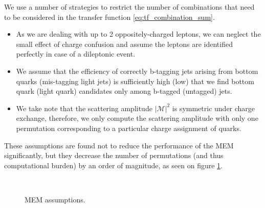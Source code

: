 We use a number of strategies to restrict the number of combinations that need to be considered in the transfer function \cref{eq:tf_combination_sum}. 
\begin{itemize}
\item As we are dealing with up to 2 oppositely-charged leptons, we can neglect the small effect of charge confusion and assume the leptons are identified perfectly in case of a dileptonic event.
\item We assume that the efficiency of correctly b-tagging jets arising from bottom quarks (mis-tagging light jets) is sufficiently high (low) that we find bottom quark (light quark) candidates only among b-tagged (untagged) jets.
\item We take note that the scattering amplitude $|\mathcal{M}|^2$ is symmetric under charge exchange, therefore, we only compute the scattering amplitude with only one permutation corresponding to a particular charge assignment of quarks.  
\end{itemize}
These assumptions are found not to reduce the performance of the MEM significantly, but they decrease the number of permutations (and thus computational burden) by an order of magnitude, as seen on figure \cref{fig:mem_assumptions}.

\begin{figure}
\begin{centering}
\\
\caption{MEM assumptions.}
\label{fig:mem_assumptions}
\end{centering}
\end{figure}


